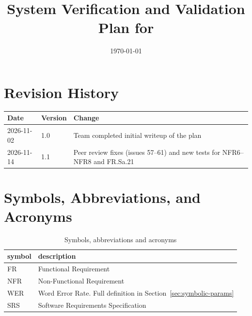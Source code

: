 \documentclass[12pt, titlepage]{article}
\begin{document}
\title{System Verification and Validation Plan for \progname{}} 
\author{\authname}
\date{\today}
	
\maketitle


\section*{Revision History}

\begin{tabularx}{\textwidth}{p{3cm}p{3cm}X}
\toprule {\bf Date} & {\bf Version} & {\bf Change}\\
\midrule
2026-11-02 & 1.0 & Team completed initial writeup of the plan\\
2026-11-14 & 1.1 & Peer review fixes (issues 57--61) and new tests for NFR6--NFR8 and FR.Sa.21\\
\bottomrule
\end{tabularx}

\newpage

\tableofcontents

\listoftables


\newpage

\section{Symbols, Abbreviations, and Acronyms}

\begin{table}[H]
\centering
\renewcommand{\arraystretch}{1.2}
\caption{Symbols, abbreviations and acronyms}
\label{tab:symbols}
\begin{tabular}{l l}
  \toprule
  \textbf{symbol} & \textbf{description}\\
  \midrule
  FR & Functional Requirement\\
  NFR & Non-Functional Requirement\\
  WER & Word Error Rate. Full definition in Section~\ref{sec:symbolic-params}\\
  SRS & Software Requirements Specification\\
  \bottomrule
\end{tabular}
\end{table}

\newpage

\end{document}
